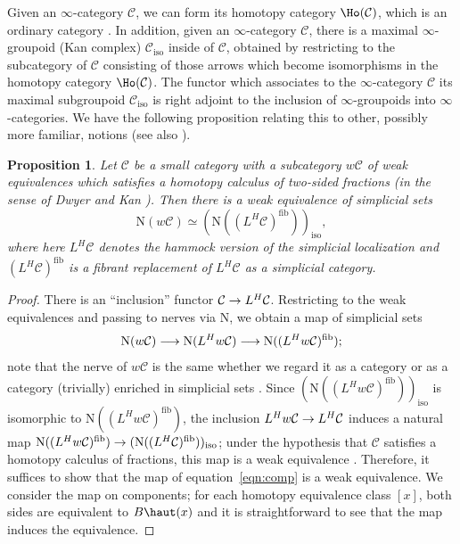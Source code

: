 \documentclass{amsart}
\renewcommand{\to}{\mathchoice{\longrightarrow}{\rightarrow}{\rightarrow}{\rightarrow}}
\let\catsymbfont\mathcal
\newcommand{\aC}{{\catsymbfont{C}}}
\newcommand{\lkan}[1]{(#1)_{\mathrm{iso}}}
\newcommand{\N}{\mathrm{N}}
\renewcommand{\i}{\infty}
\numberwithin{equation}{section}
\newtheorem{proposition}[equation]{Proposition}
\theoremstyle{definition}
\begin{document}
Given an $\i$-category $\aC$, we can form its homotopy category
  $\Ho(\aC)$, which is an ordinary category \cite[\S 1.2.3]{HTT}.  In
  addition, given an $\i$-category $\aC$, there is a maximal
  $\i$-groupoid (Kan complex) $\aC_{\mathrm{iso}}$ inside of $\aC$,
  obtained by restricting to the subcategory of $\aC$ consisting of
  those arrows which become isomorphisms in the homotopy category
  $\Ho(\aC)$.  The functor which associates to the $\i$-category $\aC$
  its maximal subgroupoid $\aC_{\mathrm{iso}}$ is right adjoint to the
  inclusion of $\i$-groupoids into $\i$-categories.  We have the
  following proposition relating this to other, possibly more
  familiar, notions (see also \cite[2.3]{ToenVezzosi}).

\begin{proposition}\label{prop:nerve}
Let $\aC$ be a small category with a subcategory $w\aC$ of weak
equivalences which satisfies a homotopy calculus of two-sided
fractions (in the sense of Dwyer and Kan \cite[6.1]{DwyerKan2}).  Then
there is a weak equivalence of simplicial sets
\[
\N(w \aC)\simeq\lkan{\N((L^H \aC)^{\mathrm{fib}})},
\]
where here $L^H \aC$ denotes the hammock version of the simplicial
localization \cite{DwyerKan2} and $(L^H \aC)^{\mathrm{fib}}$ is a fibrant
replacement of $L^H\aC$ as a simplicial category.
\end{proposition}

\begin{proof}
There is an ``inclusion'' functor $\aC \to L^{H}\aC$.  Restricting to
the weak equivalences and passing to nerves via $\N$, we
obtain a map of simplicial sets
\begin{equation}\label{eqn:comp}
\N(w\aC) \to \N(L^{H} w\aC) \to \N((L^H w\aC)^{\mathrm{fib}});
\end{equation}
note that the nerve of $w\aC$ is the same whether we regard it as a category or as a category (trivially) enriched in simplicial sets \cite[1.1.5.8]{HTT}.  
Since $\lkan{\N((L^{H} w\aC)^{\mathrm{fib}})}$ is isomorphic to $\N((L^{H}
w\aC)^{\mathrm{fib}})$, the inclusion $L^H w\aC \to L^H \aC$
induces a natural map $\N((L^{H} w\aC)^{\mathrm{fib}}) \to \lkan{\N((L^H \aC)^{\mathrm{fib}})}$;
under the hypothesis that $\aC$ satisfies a homotopy calculus of
fractions, this map is a weak equivalence \cite[6.4]{DwyerKan2}.
Therefore, it suffices to show that the map of equation~\ref{eqn:comp}
is a weak equivalence.  We consider the map on components; for each
homotopy equivalence class $[x]$, both sides are equivalent to
$B\haut(x)$ and it is straightforward to see that the map induces the
equivalence.
\end{proof}
\end{document}
